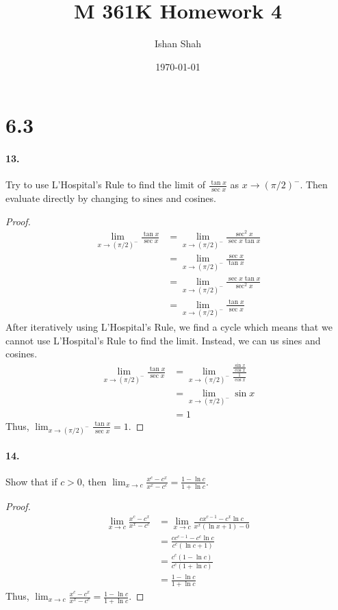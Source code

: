 \documentclass[12pt]{article}
\theoremstyle{remark}
\begin{document}
\title{M 361K Homework 4}
\author{Ishan Shah}
\date{\today}
\maketitle

\section*{6.3}
\paragraph{13.} Try to use L'Hospital's Rule to find the limit of $\frac{\tan x}{\sec x}$ as $x \rightarrow(\pi / 2)^-$. Then evaluate directly by changing to sines and cosines.
\begin{proof}
    \begin{align*}
        \lim_{x \rightarrow (\pi / 2)^-} \frac{\tan x}{\sec x} &= \lim_{x \rightarrow (\pi / 2)^-} \frac{\sec^2x}{\sec x \tan x} \\
        &= \lim_{x \rightarrow (\pi / 2)^-} \frac{\sec x}{\tan x} \\
        &= \lim_{x \rightarrow (\pi / 2)^-} \frac{\sec x \tan x}{\sec^2x} \\
        &= \lim_{x \rightarrow (\pi / 2)^-} \frac{\tan x}{\sec x}
    \end{align*}
    After iteratively using L'Hospital's Rule, we find a cycle which means that we cannot use L'Hospital's Rule to find the limit. Instead, we can us sines and cosines.
    \begin{align*}
        \lim_{x \rightarrow (\pi / 2)^-} \frac{\tan x}{\sec x} &= \lim_{x \rightarrow (\pi / 2)^-} \frac{\frac{\sin x}{\cos x}}{\frac{1}{\cos x}} \\
        &= \lim_{x \rightarrow (\pi / 2)^-} \sin x \\
        &= 1
    \end{align*}
    Thus, $\lim_{x \rightarrow (\pi / 2)^-} \frac{\tan x}{\sec x} = 1$.
\end{proof}

\paragraph{14.} Show that if $c>0$, then $\lim_{x \rightarrow c} \frac{x^c-c^x}{x^x-c^c}=\frac{1-\ln c}{1+\ln c}$.
\begin{proof}
    \begin{align*}
        \lim_{x \to c} \frac{x^c-c^x}{x^x-c^c} &= \lim_{x \to c} \frac{cx^{c - 1} - c^x \ln c}{x^x(\ln x + 1) - 0} \\
        &= \frac{cc^{c - 1} - c^c \ln c}{c^c(\ln c + 1)} \\
        &= \frac{c^c(1 - \ln c)}{c^c(1 + \ln c)} \\
        &= \frac{1 - \ln c}{1 + \ln c}
    \end{align*}
    Thus, $\lim_{x \to c} \frac{x^c-c^x}{x^x-c^c} = \frac{1 - \ln c}{1 + \ln c}$.
\end{proof}
\end{document}
